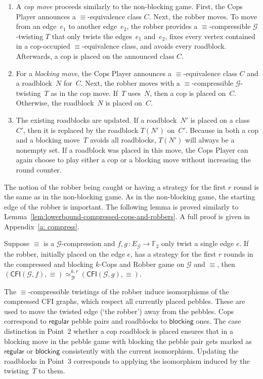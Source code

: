 \documentclass[a4paper,english, thm-restate]{lipics-v2021}
\newcommand{\defining}[1]{\emph{#1}}
\newcommand{\regular}{\mathsf{regular}}
\newcommand{\blocking}{\mathsf{blocking}}
\newcommand{\comp}{\equiv}
\newcommand{\CFIsym}{\mathsf{CFI}}
\newcommand{\CFI}[1]{\CFIsym(#1)}
\newcommand{\precompCFI}[2]{{(\CFI{#1},#2)}}
\newcommand{\FF}{\mathbb{F}}
\newcommand{\graphG}{\mathcal{G}}
\newcommand{\edgeG}{E_{\graphG}}
\newcommand{\kbequivr}[2]{\simeq_{\mathcal{B}}^{#1,#2}}
\newcommand{\ifAppendix}[1]{#1}
\begin{document}
\begin{enumerate}
        \item A \defining{cop move} proceeds similarly to the non-blocking game.
        First, the Cops Player announces a $\comp$-equivalence class $C$.
        Next, the robber moves.
        To move from an edge~$e_1$ to another edge~$e_2$, the robber provides a $\comp$\nobreakdash-compressible $\graphG$\nobreakdash-twisting $T$ that
        only twists the edges~$e_1$ and~$e_2$,
        fixes every vertex contained in a cop-occupied $\comp$\nobreakdash-equivalence class, and
        avoids every roadblock.
        Afterwards, a cop is placed on the announced class $C$.
        \item For a \defining{blocking move}, 
        the Cops Player announces a $\comp$-equivalence class $C$ and a roadblock~$N$ for~$C$. 
        Next, the robber moves with a $\comp$\nobreakdash-compressible $\graphG$\nobreakdash-twisting~$T$ as in the cop move.
        If~$T$ uses~$N$, then a cop is placed on~$C$.
        Otherwise, the roadblock~$N$ is placed on~$C$.
        \item 
        The existing roadblocks are updated.
        If a roadblock~$N'$ is placed on a class~$C'$,
        then it is replaced by the roadblock $T(N')$ on~$C'$.
        Because in both a cop and a blocking move~$T$ avoids all roadblocks, $T(N')$ will always be a nonempty set.
        If a roadblock was placed in this move,
        the Cops Player can again choose to play either a cop or a blocking move 
        without increasing the round counter. 
\end{enumerate}
The notion of the robber being caught or having a strategy for the first $r$ round is the same as in the non-blocking game.
As in the non-blocking game, the starting edge of the robber is important.
The following lemma is proved similarly to Lemma~\ref{lem:lowerbound-compressed-cops-and-robbers}.
\ifAppendix{A full proof is given in Appendix~\ref{a: compress}.}

\begin{lemma}
        \label{lem:robber-to-duplictor-blocking}
        Suppose $\comp$ is a $\graphG$-compression and 
        $f,g \, \colon \edgeG \to \FF_2$ only twist a single edge $e$.
        If the robber, initially placed on the edge $e$, has a strategy for the first $r$ rounds in the compressed and blocking $k$-Cops and Robber game
        on $\graphG$ and $\comp$, then
        $\precompCFI{\graphG,f}{\comp} \kbequivr{k}{r} \precompCFI{\graphG,g}{\comp}$.
\end{lemma}
The $\comp$\nobreakdash-compressible twistings of the robber
induce isomorphisms of the compressed CFI graphs, which respect all currently placed pebbles.
These are used to move the twisted edge (`the robber') away from the pebbles.
Cops correspond to $\regular$ pebble pairs and roadblocks to $\blocking$ ones. The case distinction in Point~2 whether a cop roadblock is placed
ensures that in a blocking move in the pebble game with blocking the pebble pair gets marked as $\regular$ or $\blocking$ consistently with the current isomorphism.
Updating the roadblocks in Point~3 corresponds to applying the isomorphism induced by the twisting~$T$ to them. 
\end{document}
